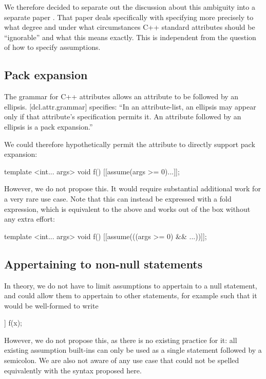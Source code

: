 We therefore decided to separate out the discussion about this ambiguity into a separate paper \cite{P2552R0}. That paper deals specifically with specifying more precisely to what degree and under what circumstances C++ standard attributes should be ``ignorable'' and what this means exactly. This is independent from the question of how to specify assumptions.

\subsection{Pack expansion}

The grammar for C++ attributes allows an attribute to be followed by an ellipsis. [dcl.attr.grammar] specifies: ``In an attribute-list, an ellipsis may appear only if that attribute's specification permits it. An attribute followed by an ellipsis is a pack expansion.''

 We could therefore hypothetically permit the  attribute to directly support pack expansion:

\begin{codeblock}
template <int... args>
void f() {
    [[assume(args >= 0)...]];
}
\end{codeblock}

However, we do not propose this. It would require substantial additional work for a very rare use case. Note that this can instead be expressed with a fold expression, which is equivalent to the above and works out of the box without any extra effort:

\begin{codeblock}
template <int... args>
void f() {
    [[assume(((args >= 0) && ...))]];
}
\end{codeblock}

\subsection{Appertaining to non-null statements}
In theory, we do not have to limit assumptions to appertain to a null statement, and could allow them to appertain to other statements, for example such that it would be well-formed to write
\begin{codeblock}
[[assume(x >= 0)]] f(x);
\end{codeblock}
However, we do not propose this, as there is no existing practice for it: all existing assumption built-ins can only be used as a single statement followed by a semicolon. We are also not aware of any use case that could not be spelled equivalently with the syntax proposed here.

